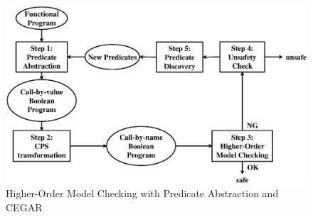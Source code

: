 \begin{figure}[tp]
 \begin{center}
  \includegraphics[scale=0.4]{overall.eps}
 \end{center}
\caption{Higher-Order Model Checking with Predicate Abstraction and CEGAR}
\label{fig:cegar}
\end{figure}


%

